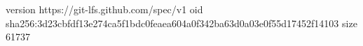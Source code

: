 version https://git-lfs.github.com/spec/v1
oid sha256:3d23cbfdf13e274ca5f1bdc0feaea604a0f342ba63d0a03e0f55d17452f14103
size 61737
